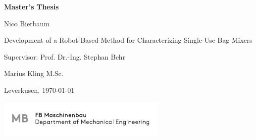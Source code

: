 \begin{minipage}[t]{11cm}
\vspace{2cm}                    
\begin{Huge}
\begin{center}\textsf{\textbf{Master's Thesis}}\end{center}
\end{Huge}


\vspace{2cm}                                
\begin{Large}
\hfill 
\begin{center}

\begin{large}
    Nico Bierbaum
\end{large}

\vspace{2cm} %
\begin{flushright}
    \hfill{Development of a Robot-Based Method for Characterizing Single-Use Bag Mixers}\\
\end{flushright}            
\end{center}    
\end{Large}

\begin{large}
\vspace{30mm}  %
\hfill Supervisor: Prof. Dr.-Ing. Stephan Behr

\hfill Marius Kling M.Sc.\\
\end{large}

\vspace{35mm}
\hfill Leverkusen, \today
\end{minipage}
\vspace{20mm}

\begin{minipage}[t]{136.5mm}
\begin{flushright}
\includegraphics[width=82mm]{bilder/MB_CMYK.pdf}
\end{flushright}
\end{minipage}
\restoregeometry
